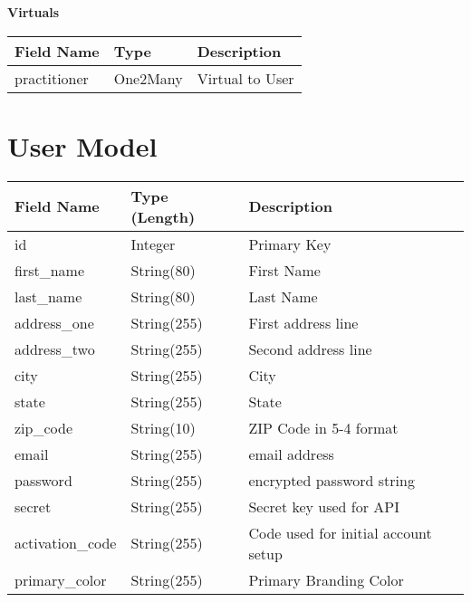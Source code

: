 \documentclass[letterpaper,10pt,english]{sphinxmanual}
\begin{document}
\textbf{Virtuals}

\begin{tabulary}{\linewidth}{|L|L|L|}
\hline
\textsf{\relax 
Field Name
} & \textsf{\relax 
Type
} & \textsf{\relax 
Description
}\\
\hline
practitioner
 & 
One2Many
 & 
Virtual to User
\\
\hline\end{tabulary}



\section{User Model}
\label{dev-models:user-model-label}\label{dev-models:user-model}
\begin{tabulary}{\linewidth}{|L|L|L|}
\hline
\textsf{\relax 
Field Name
} & \textsf{\relax 
Type (Length)
} & \textsf{\relax 
Description
}\\
\hline
id
 & 
Integer
 & 
Primary Key
\\

first\_name
 & 
String(80)
 & 
First Name
\\

last\_name
 & 
String(80)
 & 
Last Name
\\

address\_one
 & 
String(255)
 & 
First address line
\\

address\_two
 & 
String(255)
 & 
Second address line
\\

city
 & 
String(255)
 & 
City
\\

state
 & 
String(255)
 & 
State
\\

zip\_code
 & 
String(10)
 & 
ZIP Code in 5-4 format
\\

email
 & 
String(255)
 & 
email address
\\

password
 & 
String(255)
 & 
encrypted password string
\\

secret
 & 
String(255)
 & 
Secret key used for API
\\

activation\_code
 & 
String(255)
 & 
Code used for initial account setup
\\

primary\_color
 & 
String(255)
 & 
Primary Branding Color
\\


\end{tabulary}
\end{document}
